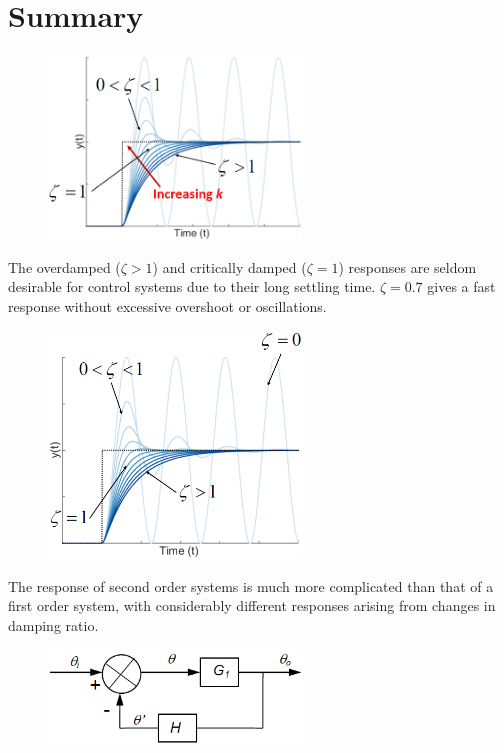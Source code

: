 \documentclass[class=report, crop=false, 12pt,a4paper]{standalone}
\begin{document}
\section{Summary}
\begin{figure}[H]
  \centering
  \includegraphics[width = 0.6\textwidth]{../img/diagram85.png}
\end{figure}
The overdamped ($\zeta > 1$) and critically damped ($\zeta = 1$) responses are seldom desirable for control systems due to their long settling time. $\zeta = 0.7$ gives a fast response without excessive overshoot or oscillations.
\begin{figure}[H]
  \centering
  \includegraphics[width = 0.6\textwidth]{../img/diagram86.png}
\end{figure}
The response of second order systems is much more complicated than that of a first order system, with considerably different responses arising from changes in damping ratio.
\begin{figure}[H]
  \centering
  \includegraphics[width = 0.6\textwidth]{../img/diagram84.png}
\end{figure}
\end{document}
